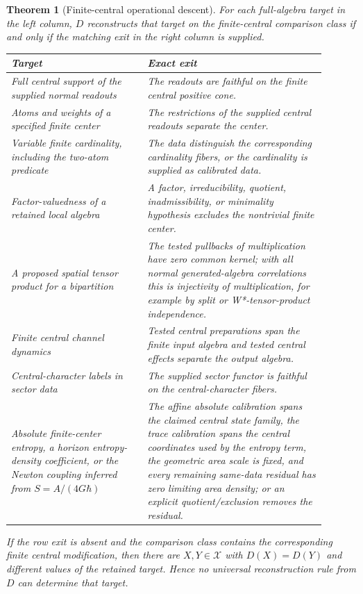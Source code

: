 \documentclass[12pt]{article}
\newtheorem{theorem}{Theorem}
\theoremstyle{definition}
\theoremstyle{remark}
\begin{document}
\begin{theorem}[Finite-central operational descent]
For each full-algebra target in the left column, \(D\) reconstructs that target
on the finite-central comparison class if and only if the matching exit in the
right column is supplied.
\begin{center}
\small
\begin{tabular}{>{\raggedright\arraybackslash}p{0.39\linewidth}
                >{\raggedright\arraybackslash}p{0.51\linewidth}}
\toprule
Target & Exact exit \\
\midrule
Full central support of the supplied normal readouts &
The readouts are faithful on the finite central positive cone. \\
Atoms and weights of a specified finite center &
The restrictions of the supplied central readouts separate the center. \\
Variable finite cardinality, including the two-atom predicate &
The data distinguish the corresponding cardinality fibers, or the
cardinality is supplied as calibrated data. \\
Factor-valuedness of a retained local algebra &
A factor, irreducibility, quotient, inadmissibility, or minimality
hypothesis excludes the nontrivial finite center. \\
A proposed spatial tensor product for a bipartition &
The tested pullbacks of multiplication have zero common kernel; with all
normal generated-algebra correlations this is injectivity of multiplication,
for example by split or W*-tensor-product independence. \\
Finite central channel dynamics &
Tested central preparations span the finite input algebra and tested central
effects separate the output algebra. \\
Central-character labels in sector data &
The supplied sector functor is faithful on the central-character fibers. \\
Absolute finite-center entropy, a horizon entropy-density coefficient, or the
Newton coupling inferred from \(S=A/(4G\hbar)\) &
The affine absolute calibration spans the claimed central state family,
the trace calibration spans the central coordinates used by the entropy term,
the geometric area scale is fixed, and every remaining same-data residual has
zero limiting area density; or an explicit quotient/exclusion removes the
residual. \\
\bottomrule
\end{tabular}
\end{center}
If the row exit is absent and the comparison class contains the corresponding
finite central modification, then there are \(X,Y\in\mathcal X\) with
\(D(X)=D(Y)\) and different values of the retained target.  Hence no
universal reconstruction rule from \(D\) can determine that target.
\end{theorem}
\end{document}
